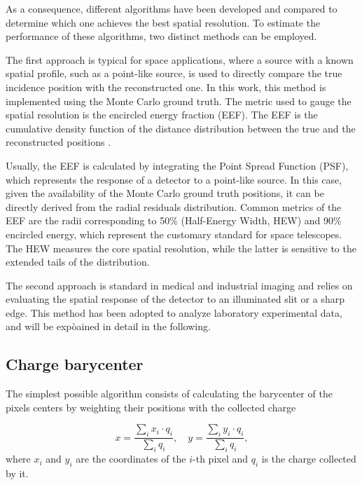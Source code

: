 As a consequence, different algorithms have been developed and compared to determine which one achieves the best spatial resolution. To estimate the performance of these algorithms, two distinct methods can be employed. 

The first approach is typical for space applications, where a source with a known spatial profile, such as a point-like source, is used to directly compare the true incidence position with the reconstructed one. In this work, this method is implemented using the Monte Carlo ground truth. The metric used to gauge the spatial resolution is the encircled energy fraction (EEF). The EEF is the cumulative density function of the distance distribution between the true and the reconstructed positions \cite{longair2011}.

Usually, the EEF is calculated by integrating the Point Spread Function (PSF), which represents the response of a detector to a point-like source. In this case, given the availability of the Monte Carlo ground truth positions, it can be directly derived from the radial residuals distribution. Common metrics of the EEF are the radii corresponding to 50\% (Half-Energy Width, HEW) and 90\% encircled energy, which represent the customary standard for space telescopes. The HEW measures the core spatial resolution, while the latter is sensitive to the extended tails of the distribution.

The second approach is standard in medical and industrial imaging and relies on evaluating the spatial response of the detector to an illuminated slit or a sharp edge. This method has been adopted to analyze laboratory experimental data, and will be expòained in detail in the following.

\subsection{Charge barycenter}
\label{subsec:barycenter}

The simplest possible algorithm consists of calculating the barycenter of the pixels centers by weighting their positions with the collected charge

\begin{equation}
x = \frac{\sum_i x_i \cdot q_i}{\sum_i q_i}, \quad y = \frac{\sum_i y_i \cdot q_i}{\sum_i q_i},
\end{equation}
where $x_i$ and $y_i$ are the coordinates of the $i$-th pixel and $q_i$ is the charge collected by it.

